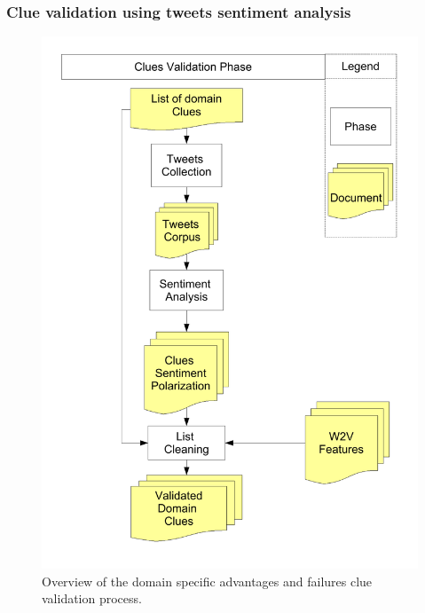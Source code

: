 \documentclass[b5paper,]{book}
\theoremstyle{definition}
\theoremstyle{definition}
\theoremstyle{definition}
\theoremstyle{remark}
\begin{document}
\subsubsection*{Clue validation using tweets sentiment
analysis}\label{clue-validation-using-tweets-sentiment-analysis}

\begin{figure}

{\centering \includegraphics[width=0.8\linewidth]{_bookdown_files/figures/pointer-validation-phase} 

}

\caption{Overview of the domain specific advantages and failures clue validation process.}\label{fig:advdrwarticleprocessfigcluevalidationphase}
\end{figure}
\end{document}
